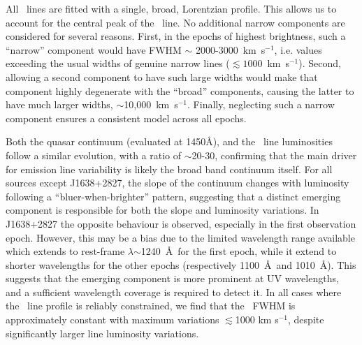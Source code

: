 \documentclass[fleqn,usenatbib]{mnras}
\begin{document}
All \civ\ lines are fitted with a single, broad, Lorentzian profile.
This allows us to account for the central peak of the \civ\ line.  No
additional narrow components are considered for several reasons.
First, in the epochs of highest brightness, such a ``narrow''
component would have FWHM $\sim$ 2000-3000~km~s$^{-1}$, i.e. values
exceeding the usual widths of genuine narrow lines ($\lesssim
1000$~km~s$^{-1}$). Second, allowing a second component to have such
large widths would make that component highly degenerate with the
``broad'' components, causing the latter to have much larger widths,
$\sim$10,000~km~s$^{-1}$.  Finally, neglecting such a narrow
component ensures a consistent model across all epochs.

Both the quasar continuum (evaluated at 1450\AA), and the \civ\ line
luminosities follow a similar evolution, with a ratio of $\sim$20-30,
confirming that the main driver for emission line variability is
likely the broad band continuum itself.  For all sources except
J1638+2827, the slope of the continuum changes with luminosity
following a ``bluer-when-brighter'' pattern, suggesting that a
distinct emerging component is responsible for both the slope and
luminosity variations.  In J1638+2827 the opposite behaviour is
observed, especially in the first observation epoch.  However, this
may be a bias due to the limited wavelength range available which
extends to rest-frame $\lambda$$\sim$1240~\AA\ for the first epoch,
while it extend to shorter wavelengths for the other epochs
(respectively 1100~\AA\ and 1010~\AA).  This suggests that the emerging
component is more prominent at UV wavelengths, and a sufficient
wavelength coverage is required to detect it. In all cases where the
\civ\ line profile is reliably constrained, we find that the \civ\
FWHM is approximately constant with maximum variations $\lesssim$1000 
km s$^{-1}$, despite significantly larger line luminosity variations.
\end{document}
